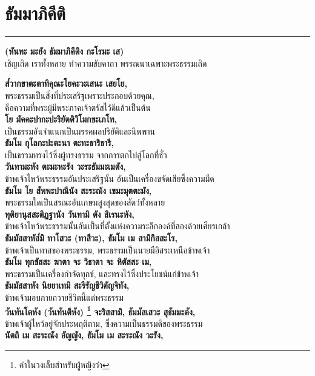 \documentclass[12pt]{article}
\begin{document}
\section{ธัมมาภิคีติ}
\hrule
\begin{center}
\textbf{(หันทะ มะยัง ธัมมาภิคีติง กะโรมะ เส)}\\
เชิญเถิด เราทั้งหลาย ทำความขับคาถา พรรณนาเฉพาะพระธรรมเถิด
\end{center}
\textbf{ส๎วากขาตะตาทิคุณะโยคะวะเสนะ เสยโย,}\\
\indent พระธรรมเป็นสิ่งที่ประเสริฐเพราะประกอบด้วยคุณ,\\ 
\indent คือความที่พระผู้มีพระภาคเจ้าตรัสไว้ดีแล้วเป็นต้น\\
\textbf{โย มัคคะปากะปะริยัตติวิโมกขะเภโท,}\\
\indent เป็นธรรมอันจำแนกเป็นมรรคผลปริยัติและนิพพาน\\
\textbf{ธัมโม กุโลกะปะตะนา ตะทะธาริธารี,}\\
\indent เป็นธรรมทรงไว้ซึ่งผู้ทรงธรรม จากการตกไปสู่โลกที่ชั่ว\\
\textbf{วันทามะหัง ตะมะหะรัง วะระธัมมะเมตัง,}\\
\indent ข้าพเจ้าไหว้พระธรรมอันประเสริฐนั้น อันเป็นเครื่องขจัดเสียซึ่งความมืด\\
\textbf{ธัมโม โย สัพพะปาณีนัง สะระณัง เขมะมุตตะมัง,}\\
\indent พระธรรมใดเป็นสรณะอันเกษมสูงสุดของสัตว์ทั้งหลาย\\
\textbf{ทุติยานุสสะติฏฐานัง วันทามิ ตัง สิเรนะหัง,}\\
\indent ข้าพเจ้าไหว้พระธรรมนั้นอันเป็นที่ตั้งแห่งความระลึกองค์ที่สองด้วยเศียรเกล้า\\
\textbf{ธัมมัสสาหัส๎มิ ทาโสวะ (ทาสีวะ), ธัมโม เม สามิกิสสะโร,}\\
\indent ข้าพเจ้าเป็นทาสของพระธรรม, พระธรรมเป็นนายมีอิสระเหนือข้าพเจ้า\\
\textbf{ธัมโม ทุกขัสสะ ฆาตา จะ วิธาตา จะ หิตัสสะ เม,}\\
\indent พระธรรมเป็นเครื่องกำจัดทุกข์, และทรงไว้ซึ่งประโยชน์แก่ข้าพเจ้า\\
\textbf{ธัมมัสสาหัง นิยยาเทมิ สะรีรัญชีวิตัญจิทัง,}\\
\indent ข้าพเจ้ามอบกายถวายชีวิตนี้แด่พระธรรม\\
\textbf{วันทันโตหัง (วันทันตีหัง) \footnote{คำในวงเล็บสำหรับผู้หญิงว่า} จะริสสามิ, ธัมมัสเสวะ สุธัมมะตัง,}\\
\indent ข้าพเจ้าผู้ไหว้อยู่จักประพฤติตาม, ซึ่งความเป็นธรรมดีของพระธรรม\\
\textbf{นัตถิ เม สะระณัง อัญญัง, ธัมโม เม สะระณัง วะรัง,}\\
\end{document}
